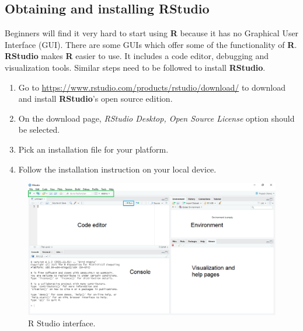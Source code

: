 \documentclass[
  10pt,
  b5paper,
  oneside]{book}
\providecommand{\tightlist}{%
  \setlength{\itemsep}{0pt}\setlength{\parskip}{0pt}}
\begin{document}
\hypertarget{obtaining-and-installing-rstudio}{%
\subsection{Obtaining and installing RStudio}\label{obtaining-and-installing-rstudio}}

Beginners will find it very hard to start using \textbf{R} because it has no Graphical User Interface (GUI). There are some GUIs which offer some of the functionality of \textbf{R}. \textbf{RStudio} makes \textbf{R} easier to use. It includes a code editor, debugging and visualization tools. Similar steps need to be followed to install \textbf{RStudio}.

\begin{enumerate}
\def\labelenumi{\arabic{enumi}.}
\tightlist
\item
  Go to \url{https://www.rstudio.com/products/rstudio/download/} to download and install \textbf{RStudio}'s open source edition.
\item
  On the download page, \emph{RStudio Desktop, Open Source License} option should be selected.
\item
  Pick an installation file for your platform.
\item
  Follow the installation instruction on your local device.
\end{enumerate}

\begin{figure}
\includegraphics[width=18.97in]{images/2_RStudio-interface} \caption{R Studio interface.}\label{fig:Rstudio}
\end{figure}
\end{document}
